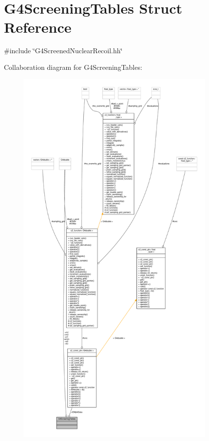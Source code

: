 \hypertarget{structG4ScreeningTables}{}\section{G4\+Screening\+Tables Struct Reference}
\label{structG4ScreeningTables}


{\ttfamily \#include \char`\"{}G4\+Screened\+Nuclear\+Recoil.\+hh\char`\"{}}



Collaboration diagram for G4\+Screening\+Tables\+:
\nopagebreak
\begin{figure}[H]
\begin{center}
\leavevmode
\includegraphics[height=550pt]{structG4ScreeningTables__coll__graph}
\end{center}
\end{figure}
